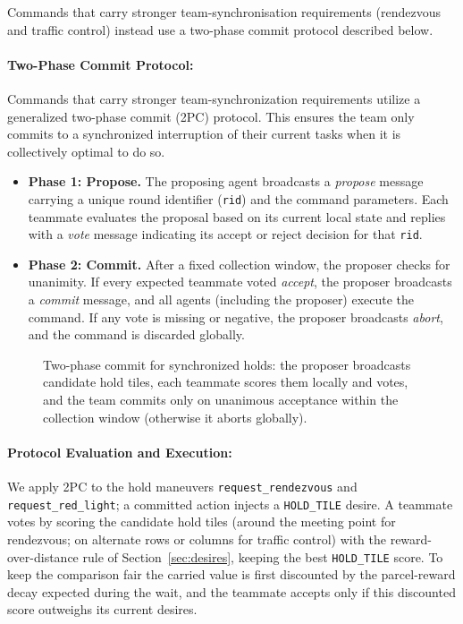 Commands that carry stronger team-synchronisation requirements (rendezvous and traffic control) instead use a two-phase commit protocol described below.

\paragraph{Two-Phase Commit Protocol:}
Commands that carry stronger team-synchronization requirements utilize a generalized two-phase commit (2PC) protocol. 
This ensures the team only commits to a synchronized interruption of their current tasks when it is collectively optimal to do so.

\begin{itemize}
    \item \textbf{Phase 1: Propose.} The proposing agent broadcasts a \emph{propose} message carrying a unique round identifier (\texttt{rid}) and the command parameters. 
    Each teammate evaluates the proposal based on its current local state and replies with a \emph{vote} message indicating its accept or reject decision for that \texttt{rid}.
    \item \textbf{Phase 2: Commit.} After a fixed collection window, the proposer checks for unanimity. 
    If every expected teammate voted \emph{accept}, the proposer broadcasts a \emph{commit} message, and all agents (including the proposer) execute the command. 
    If any vote is missing or negative, the proposer broadcasts \emph{abort}, and the command is discarded globally.
\end{itemize}

\begin{figure}[H]
  \centering
  \resizebox{\textwidth}{!}{%
  }
  \caption{Two-phase commit for synchronized holds: the proposer broadcasts candidate
  hold tiles, each teammate scores them locally and votes, and the team commits only on
  unanimous acceptance within the collection window (otherwise it aborts globally).}
  \label{fig:two-phase-commit}
\end{figure}

\paragraph{Protocol Evaluation and Execution:}
We apply 2PC to the hold maneuvers \texttt{request\_rendezvous} and \texttt{request\_red\_light}; a committed action injects a \texttt{HOLD\_TILE} desire.
A teammate votes by scoring the candidate hold tiles (around the meeting point for rendezvous; on alternate rows or columns for traffic control) with the reward-over-distance rule of Section~\ref{sec:desires}, keeping the best \texttt{HOLD\_TILE} score. To keep the comparison fair the carried value is first discounted by the parcel-reward decay expected during the wait, and the teammate accepts only if this discounted score outweighs its current desires.

